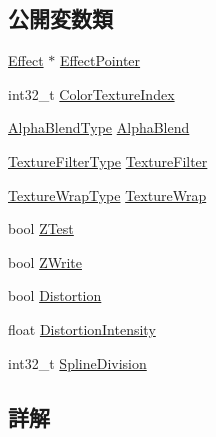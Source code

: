 \subsection*{公開変数類}
\begin{DoxyCompactItemize}
\item 
\mbox{\hyperlink{class_effekseer_1_1_effect}{Effect}} $\ast$ \mbox{\hyperlink{struct_effekseer_1_1_track_renderer_1_1_node_parameter_a00ceee28cf8cea7044e4ad1f57b77638}{Effect\+Pointer}}
\item 
int32\+\_\+t \mbox{\hyperlink{struct_effekseer_1_1_track_renderer_1_1_node_parameter_af56f97c8a66ba32dcbdd511de20101bd}{Color\+Texture\+Index}}
\item 
\mbox{\hyperlink{namespace_effekseer_a8c32fd5b7ec7feed73314b2ae8086949}{Alpha\+Blend\+Type}} \mbox{\hyperlink{struct_effekseer_1_1_track_renderer_1_1_node_parameter_a7de609e147614ce59ff02c45e94659ed}{Alpha\+Blend}}
\item 
\mbox{\hyperlink{namespace_effekseer_ae3518502cfcb4ec4991f13c0b3e4c6ee}{Texture\+Filter\+Type}} \mbox{\hyperlink{struct_effekseer_1_1_track_renderer_1_1_node_parameter_a4fbe911478d0134f0400648deca18a6e}{Texture\+Filter}}
\item 
\mbox{\hyperlink{namespace_effekseer_a5320c83784602974b6278bf1a77b58a3}{Texture\+Wrap\+Type}} \mbox{\hyperlink{struct_effekseer_1_1_track_renderer_1_1_node_parameter_ac5097e042b8ed3d64d7e3724ea43ba9d}{Texture\+Wrap}}
\item 
bool \mbox{\hyperlink{struct_effekseer_1_1_track_renderer_1_1_node_parameter_a28fd38571670062a60b8ea12128c9ff7}{Z\+Test}}
\item 
bool \mbox{\hyperlink{struct_effekseer_1_1_track_renderer_1_1_node_parameter_aee94934faee558a0c2ee1750b1e1051b}{Z\+Write}}
\item 
bool \mbox{\hyperlink{struct_effekseer_1_1_track_renderer_1_1_node_parameter_a2f69bb5e61c65a48a65b48a2c05cafb7}{Distortion}}
\item 
float \mbox{\hyperlink{struct_effekseer_1_1_track_renderer_1_1_node_parameter_a0fa3df9fb51fd6446dd3d5aaaacd0533}{Distortion\+Intensity}}
\item 
int32\+\_\+t \mbox{\hyperlink{struct_effekseer_1_1_track_renderer_1_1_node_parameter_a05f91db977b5cd8fa507fb2079265c72}{Spline\+Division}}
\end{DoxyCompactItemize}


\subsection{詳解}


